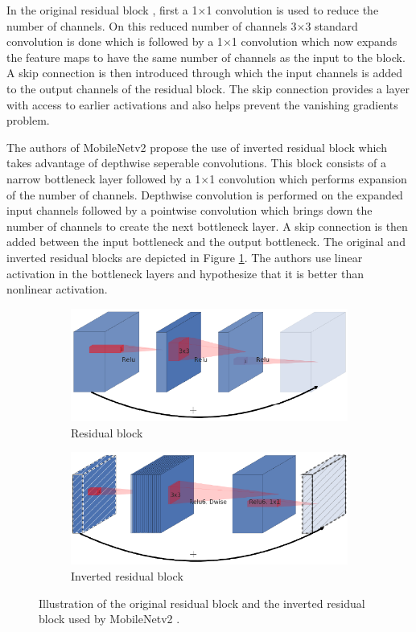 In the original residual block \cite{DBLP:journals/corr/HeZRS15}, first a 1$\times$1 convolution is used to reduce the number of channels. On this reduced number of channels 3$\times$3 standard convolution is done which is followed by a 1$\times$1 convolution which now expands the feature maps to have the same number of channels as the input to the block. A skip connection is then introduced through which the input channels is added to the output channels of the residual block. The skip connection provides a layer with access to earlier activations and also helps prevent the vanishing gradients problem. 

The authors of MobileNetv2 propose the use of inverted residual block which takes advantage of depthwise seperable convolutions. This block consists of a narrow bottleneck layer followed by a 1$\times$1 convolution which performs expansion of the number of channels. Depthwise convolution is performed on the expanded input channels followed by a pointwise convolution which brings down the number of channels to create the next bottleneck layer. A skip connection is then added between the input bottleneck and the output bottleneck. The original and inverted residual blocks are depicted in Figure \ref{Fig:residual}. The authors use linear activation in the bottleneck layers and hypothesize that it is better than nonlinear activation.

	\begin{figure}
		\begin{subfigure}{.5\textwidth}
			\centering
			\includegraphics[width=.8\linewidth]{images/residual}
			\caption{Residual block}
		\end{subfigure}
		\begin{subfigure}{.5\textwidth}
			\centering
			\includegraphics[width=.8\linewidth]{images/inverted_residual}
			\caption{Inverted residual block}
		\end{subfigure}
		\caption{Illustration of the original residual block and the inverted residual block used by MobileNetv2 \cite{DBLP:journals/corr/abs-1801-04381}.}
		\label{Fig:residual}
	\end{figure}

